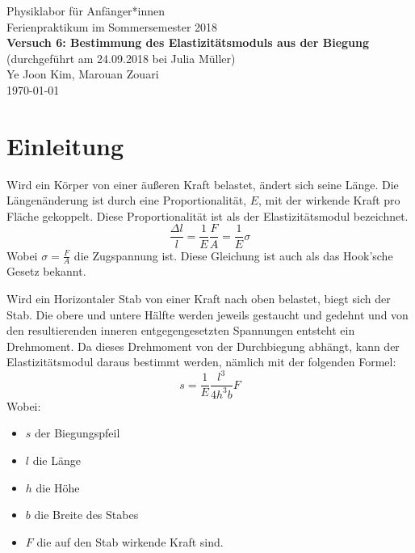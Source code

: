 \documentclass[11pt,a4paper]{article}
\begin{document}
{
	\centering 
	\large 
	Physiklabor für Anfänger*innen \\
	Ferienpraktikum im Sommersemester 2018 \\[4mm]
	\textbf{\LARGE 
		Versuch 6: Bestimmung des Elastizitätsmoduls aus der Biegung
	} \\[3mm]
	(durchgeführt am 24.09.2018 bei Julia Müller) \\
	Ye Joon Kim, Marouan Zouari\\
	\today \\[10mm]
}
\tableofcontents

\section{Einleitung}
Wird ein Körper von einer äußeren Kraft belastet, ändert sich seine Länge. Die Längenänderung ist durch eine Proportionalität, $E$, mit der wirkende Kraft pro Fläche gekoppelt. Diese Proportionalität ist als der Elastizitätsmodul bezeichnet. 
\begin{equation}
\frac{\Delta l}{l} = \frac{1}{E}\frac{F}{A} = \frac{1}{E}\sigma
\end{equation}
Wobei $\sigma = \frac{F}{A}$ die Zugspannung ist. Diese Gleichung ist auch als das Hook'sche Gesetz bekannt.

Wird ein Horizontaler Stab von einer Kraft nach oben belastet, biegt sich der Stab. Die obere und untere Hälfte werden jeweils gestaucht und gedehnt und von den resultierenden inneren entgegengesetzten Spannungen entsteht ein Drehmoment. Da dieses Drehmoment von der Durchbiegung abhängt, kann der Elastizitätsmodul daraus bestimmt werden, nämlich mit der folgenden Formel:
\begin{equation}
s = \frac{1}{E}\frac{l^3}{4h^3b}F
\end{equation}
Wobei:
\begin{itemize}
	\item $s$ der Biegungspfeil
	\item $l$ die Länge 
	\item $h$ die Höhe
	\item $b$ die Breite des Stabes
	\item $F$ die auf den Stab wirkende Kraft sind.
\end{itemize}
\end{document}
